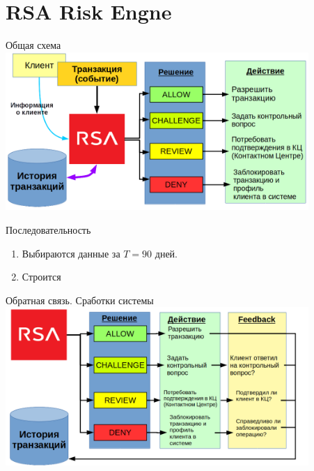 \section{RSA Risk Engne}

\begin{frame}{Общая схема} 
	\includegraphics[width=11.5cm]{../pic/expert_system_rsa.png}
\end{frame}

\begin{frame}{Последовательность}
	
	\begin{enumerate}
		\item Выбираются данные за $T=90$ дней.
		\item Строится 
	\end{enumerate}

\end{frame}

\begin{frame}{Обратная связь. Сработки системы}\label{frame:rsa_feedback}
\includegraphics[width=11.5cm]{../pic/expert_system_rsa_feedback.png}
\end{frame}


